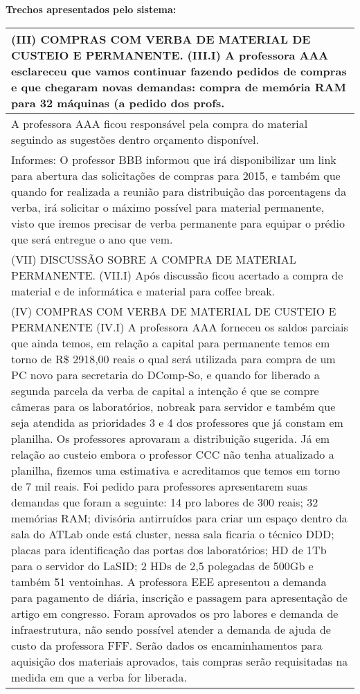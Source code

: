 \noindent
\textbf{Trechos apresentados pelo sistema:}
\begin{longtable}{|p{17.5cm}|}
\hline 
(III) COMPRAS COM VERBA DE MATERIAL DE CUSTEIO E PERMANENTE. (III.I) A professora AAA esclareceu que vamos continuar fazendo pedidos de compras e que chegaram novas demandas: compra de memória RAM para 32 máquinas (a pedido dos profs.

 \\ \hline 
A professora AAA ficou responsável pela compra do material seguindo as sugestões dentro orçamento disponível.

 \\ \hline 
Informes: O professor BBB informou que irá disponibilizar um link para abertura das solicitações de compras para 2015, e também que quando for realizada a reunião para distribuição das porcentagens da verba, irá solicitar o máximo possível para material permanente, visto que iremos precisar de verba permanente para equipar o prédio que será entregue o ano que vem.

 \\ \hline 
(VII) DISCUSSÃO SOBRE A COMPRA DE MATERIAL PERMANENTE. (VII.I) Após discussão ficou acertado a compra de material e de informática e material para coffee break.

 \\ \hline 
(IV) COMPRAS COM VERBA DE MATERIAL DE CUSTEIO E PERMANENTE (IV.I) A professora AAA forneceu os saldos parciais que ainda temos, em relação a capital para permanente temos em torno de R\$ 2918,00 reais o qual será utilizada para compra de um PC novo para secretaria do DComp-So, e quando for liberado a segunda parcela da verba de capital a intenção é que se compre câmeras para os laboratórios, nobreak para servidor e também que seja atendida as prioridades 3 e 4 dos professores que já constam em planilha. Os professores aprovaram a distribuição sugerida. Já em relação ao custeio embora o professor CCC não tenha atualizado a planilha, fizemos uma estimativa e acreditamos que temos em torno de 7 mil reais. Foi pedido para professores apresentarem suas demandas que foram a seguinte: 14 pro labores de 300 reais; 32 memórias RAM; divisória antirruídos para criar um espaço dentro da sala do ATLab onde está cluster, nessa sala ficaria o técnico DDD; placas para identificação das portas dos laboratórios; HD de 1Tb para o servidor do LaSID; 2 HDs de 2,5 polegadas de 500Gb e também 51 ventoinhas. A professora EEE apresentou a demanda para pagamento de diária, inscrição e passagem para apresentação de artigo em congresso. Foram aprovados os pro labores e demanda de infraestrutura, não sendo possível atender a demanda de ajuda de custo da professora FFF. Serão dados os encaminhamentos para aquisição dos materiais aprovados, tais compras serão requisitadas na medida em que a verba for liberada.

 \\ \hline 

\end{longtable} 



